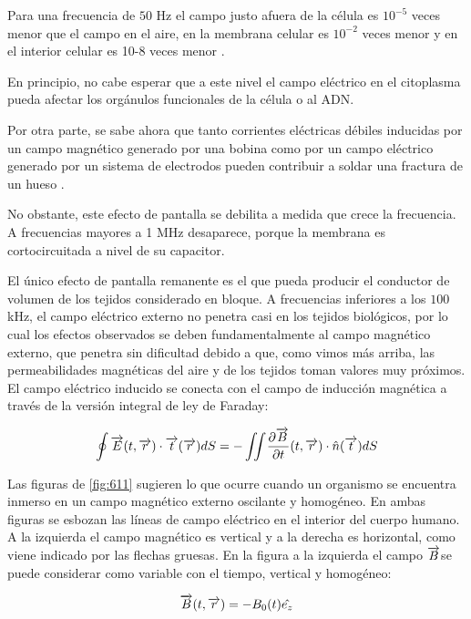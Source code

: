 Para una frecuencia de $50$ Hz el campo justo afuera de la célula es $10^{-5}$ veces menor que el campo en el aire, en la membrana celular es $10^{-2}$ veces menor y en el interior celular es 10-8 veces menor \citep{Lin_2012} \citep{Polk_Postow_2006} \citep{Greenebaum_Barnes_2019}.

En principio, no cabe esperar que a este nivel el campo eléctrico en el citoplasma pueda afectar los orgánulos funcionales de la célula o al ADN.

Por otra parte, se sabe ahora que tanto corrientes eléctricas débiles inducidas por un campo magnético generado por una bobina como por un campo eléctrico generado por un sistema de electrodos pueden contribuir a soldar una fractura de un hueso \citep{Polk_Postow_2006} \citep{Markov_2015}.

No obstante, este efecto de pantalla se debilita a medida que crece la frecuencia.
A frecuencias mayores a 1 MHz desaparece, porque la membrana es cortocircuitada a nivel de su capacitor.

El único efecto de pantalla remanente es el que pueda producir el conductor de volumen de los tejidos considerado en bloque.
A frecuencias inferiores a los $100$ kHz, el campo eléctrico externo no penetra casi en los tejidos biológicos, por lo cual los efectos observados se deben fundamentalmente al campo magnético externo, que penetra sin dificultad debido a que, como vimos más arriba, las permeabilidades magnéticas del aire y de los tejidos toman valores muy próximos.
El campo eléctrico inducido se conecta con el campo de inducción magnética a través de la versión integral de ley de Faraday:

\begin{equation}
	\oint \overrightarrow{E}(t,\overrightarrow{r}) \cdot \overrightarrow{t}(\overrightarrow{r})dS= -\iint \dfrac{\partial \overrightarrow{B}}{\partial t}(t,\overrightarrow{r})\cdot \hat{n}(\overrightarrow{t}) dS
\end{equation}

Las figuras de \ref{fig:611} sugieren lo que ocurre cuando un organismo se encuentra inmerso en un campo magnético externo oscilante y homogéneo. En ambas figuras se esbozan las líneas de campo eléctrico en el interior del cuerpo humano. A la izquierda el campo magnético es vertical y a la derecha es horizontal, como viene indicado por las flechas gruesas. En la figura a la izquierda el campo $\overrightarrow{B}$se puede considerar como variable con el tiempo, vertical y homogéneo:

\begin{equation}
	\overrightarrow{B}(t,\overrightarrow{r}) = -B_{0}(t)\hat{e_{z}}
\end{equation}


